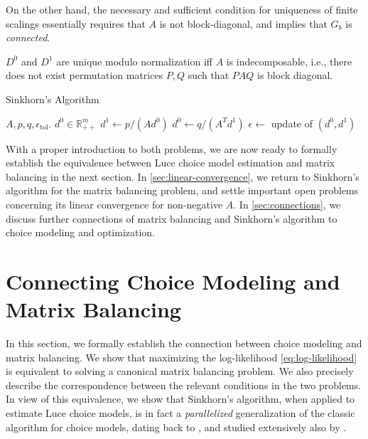 On the other hand, the necessary and sufficient condition for uniqueness of finite scalings essentially requires that $A$ is not block-diagonal, and implies that $G_b$ is \emph{connected}.
\begin{assumption}
\label{ass:matrix-uniqueness}
 $D^{0}$ and $D^{1}$ are unique modulo normalization iff $A$ is indecomposable, i.e., there does not exist permutation matrices $P,Q$ such that $PAQ$ is block diagonal.
\end{assumption} 
\begin{algorithm}[tb]
\caption{Sinkhorn's Algorithm}
   \label{alg:scaling}
\begin{algorithmic}
     $A, p, q,\epsilon_{\text{tol}}$.
    $d^{0}\in\mathbb{R}_{++}^{m}$
   \REPEAT
   \STATE $d^{1} \leftarrow  p/( A d^0)$ 
   \STATE $d^{0}\leftarrow  q/({A}^{T} d^{1})$
   \STATE 
$\epsilon\leftarrow$  update of $(d^{0},d^1)$
\end{algorithmic}
\end{algorithm}
 
With a proper introduction to both problems, we are now ready to formally establish the equivalence between Luce choice model estimation and matrix balancing in the next section. In \cref{sec:linear-convergence}, we return to Sinkhorn's algorithm for the matrix balancing problem, and settle important open problems concerning its linear convergence for non-negative $A$.  In \cref{sec:connections}, we discuss further connections of matrix balancing and Sinkhorn's algorithm to choice modeling and optimization.

\section{Connecting Choice Modeling and Matrix Balancing}
\label{sec:equivalence}

In this section, we formally establish the connection between choice modeling and matrix balancing. We show that
maximizing the log-likelihood \eqref{eq:log-likelihood} is equivalent to solving a canonical matrix balancing problem. We also precisely describe the correspondence between the relevant conditions in the two problems. In view of this equivalence, we show that Sinkhorn's algorithm, when applied to estimate Luce choice models, is in fact a \emph{parallelized} generalization of the classic algorithm for choice models, dating back to \citet{zermelo1929berechnung,dykstra1956note,ford1957solution}, and studied extensively also by \citet{hunter2004mm,vojnovic2020convergence}. %

